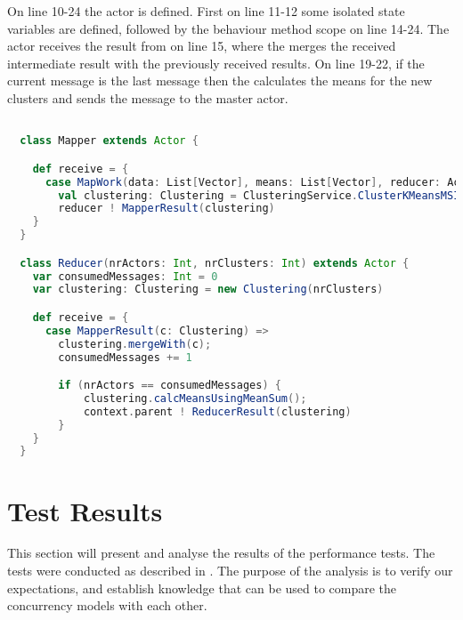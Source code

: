 On line 10-24 the  actor is defined. First on line 11-12 some isolated state variables are defined, followed by the behaviour method scope on line 14-24.
The  actor receives the result from  on line 15, where the  merges the received intermediate result with the previously received results. On line 19-22, if the current message is the last message then the  calculates the means for the new clusters and sends the  message to the master actor.

\begin{lstlisting}[float,label=lst:actor_implementation,
  caption={Actor Implementation},
  language=Scala,  
  showspaces=false,
  showtabs=false,
  breaklines=true,
  showstringspaces=false,
  breakatwhitespace=true,
  commentstyle=\color{greencomments},
  keywordstyle=\color{bluekeywords},
  stringstyle=\color{redstrings}]  % Start your code-block

  class Mapper extends Actor {

    def receive = {
      case MapWork(data: List[Vector], means: List[Vector], reducer: ActorRef) =>
        val clustering: Clustering = ClusteringService.ClusterKMeansMSIncremental(data, means)
        reducer ! MapperResult(clustering)
    }
  }

  class Reducer(nrActors: Int, nrClusters: Int) extends Actor {
    var consumedMessages: Int = 0
    var clustering: Clustering = new Clustering(nrClusters)

    def receive = {
      case MapperResult(c: Clustering) =>
        clustering.mergeWith(c);
        consumedMessages += 1

        if (nrActors == consumedMessages) {
            clustering.calcMeansUsingMeanSum();
            context.parent ! ReducerResult(clustering)
        }
    }
  }  
\end{lstlisting}

\section{Test Results}\label{sec:test_result}
This section will present and analyse the results of the performance tests. The tests were conducted as described in . The purpose of the analysis is to verify our expectations, and establish knowledge that can be used to compare the concurrency models with each other.

